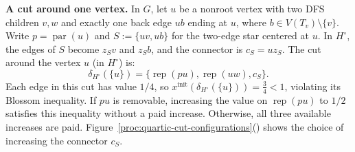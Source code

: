 \documentclass[11pt]{amsart}
\newcommand{\rep}[1]{\operatorname{rep}(#1)}
\newcommand{\1}{\mathbbm{1}}
\begin{document}
\smallskip\noindent\textbf{A cut around one vertex.}
{In $G$, let $u$ be a nonroot vertex with
two DFS children $v,w$ and exactly one back edge $ub$ ending
at $u$, where $b\in V(T_v)\setminus\{v\}$.
Write $p=\operatorname{par}(u)$ and
$S:=\{uv,ub\}$ for the two-edge star centered at $u$.
In $H^\circ$, the edges of $S$ become $z_Sv$ and $z_Sb$,
and the connector is $c_S=uz_S$. The cut around the vertex $u$ (in $H^\circ$) is:
\[
 \delta_{H^\circ}(\{u\})
 =\{\rep{pu},\rep{uw},c_S\}.
\]
Each edge in this cut has value $1/4$, so
 $x^{\mathrm{init}}(\delta_{H^\circ}(\{u\}))
 =\frac34<1$,
violating its Blossom inequality.
If $pu$ is removable, increasing the value on $\rep{pu}$
to $1/2$ satisfies this inequality without a paid increase.
Otherwise, all three available increases are paid.
Figure~\ref{proc:quartic-cut-configurations}() shows the choice
of increasing the connector $c_S$.}
\end{document}
